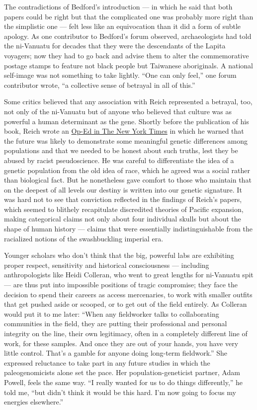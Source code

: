 The contradictions of Bedford's introduction --- in which he said that
both papers could be right but that the complicated one was probably
more right than the simplistic one --- felt less like an equivocation
than it did a form of subtle apology. As one contributor to Bedford's
forum observed, archaeologists had told the ni-Vanuatu for decades that
they were the descendants of the Lapita voyagers; now they had to go
back and advise them to alter the commemorative postage stamps to
feature not black people but Taiwanese aboriginals. A national
self-image was not something to take lightly. ``One can only feel,'' one
forum contributor wrote, ``a collective sense of betrayal in all of
this.''

Some critics believed that any association with Reich represented a
betrayal, too, not only of the ni-Vanuatu but of anyone who believed
that culture was as powerful a human determinant as the gene. Shortly
before the publication of his book, Reich wrote an
\href{https://www.nytimes3xbfgragh.onion/2018/03/23/opinion/sunday/genetics-race.html}{Op-Ed
in The New York Times} in which he warned that the future was likely to
demonstrate some meaningful genetic differences among populations and
that we needed to be honest about such truths, lest they be abused by
racist pseudoscience. He was careful to differentiate the idea of a
genetic population from the old idea of race, which he agreed was a
social rather than biological fact. But he nonetheless gave comfort to
those who maintain that on the deepest of all levels our destiny is
written into our genetic signature. It was hard not to see that
conviction reflected in the findings of Reich's papers, which seemed to
blithely recapitulate discredited theories of Pacific expansion, making
categorical claims not only about four individual skulls but about the
shape of human history --- claims that were essentially
indistinguishable from the racialized notions of the swashbuckling
imperial era.

Younger scholars who don't think that the big, powerful labs are
exhibiting proper respect, sensitivity and historical consciousness ---
including anthropologists like Heidi Colleran, who went to great lengths
for ni-Vanuatu spit --- are thus put into impossible positions of tragic
compromise; they face the decision to spend their careers as access
mercenaries, to work with smaller outfits that get pushed aside or
scooped, or to get out of the field entirely. As Colleran would put it
to me later: ``When any fieldworker talks to collaborating communities
in the field, they are putting their professional and personal integrity
on the line, their own legitimacy, often in a completely different line
of work, for these samples. And once they are out of your hands, you
have very little control. That's a gamble for anyone doing long-term
fieldwork.'' She expressed reluctance to take part in any future studies
in which the paleogenomicists alone set the pace. Her
population-geneticist partner, Adam Powell, feels the same way. ``I
really wanted for us to do things differently,'' he told me, ``but
didn't think it would be this hard. I'm now going to focus my energies
elsewhere.''

